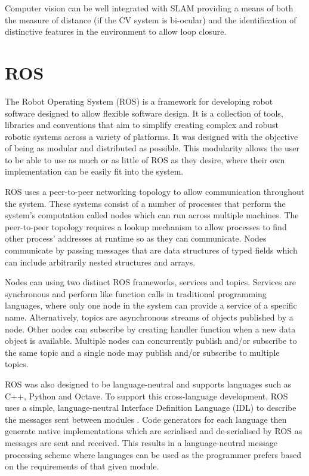 Computer vision can be well integrated with SLAM providing a means of both the measure
of distance (if the CV system is bi-ocular) and the identification of distinctive
features in the environment to allow loop closure\cite{CVho2006loop}.

\section{ROS}\label{litreview/ROS}
The Robot Operating System (ROS) is a framework for developing robot
software designed to allow flexible software design. It is a collection of tools, 
libraries and conventions that aim to simplify creating complex and 
robust robotic systems across a variety of platforms\cite{aboutROS}. 
It was designed with the objective of being as modular and distributed
as possible. This modularity allows the user to be able to use as much or
as little of ROS as they desire, where their own implementation can be
easily fit into the system. \cite{rosForMe}

ROS uses a peer-to-peer networking topology to allow communication 
throughout the system. These systems consist of a number of processes  
that perform the system's computation called nodes which can  
run across multiple machines. The peer-to-peer topology requires 
a lookup mechanism to allow processes to find other process' addresses at 
runtime so as they can communicate. Nodes communicate by passing messages 
that are data structures of typed fields which can include arbitrarily nested 
structures and arrays. \cite{crick2017rosbridge}

Nodes can using two distinct ROS frameworks, services and topics. 
Services are synchronous and perform like function
calls in traditional programming languages, where only one node in the 
system can provide a service of a specific name. Alternatively, topics are
asynchronous streams of objects published by a node. Other nodes can 
subscribe by creating  handler function when a new data object is available.
Multiple nodes can concurrently publish and/or subscribe to the same topic and
a single node may publish and/or subscribe to multiple topics.

ROS was also designed to be language-neutral and supports languages 
such as C++, Python and Octave. To support this cross-language 
development, ROS uses a simple, language-neutral Interface Definition 
Language (IDL) to describe the messages sent between modules 
\cite{quigley2009ros}. Code generators for each language then generate 
native implementations which are serialised and de-serialised by ROS 
as messages are sent and received. This results in a language-neutral 
message processing scheme where languages can be used as the programmer 
prefers based on the requirements of that given module. 

